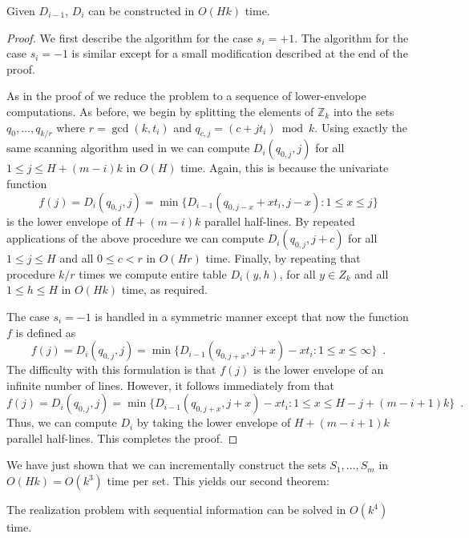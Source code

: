 \documentclass[lotsofwhite]{patmorin}
\newcommand{\Z}{\mathbb{Z}}
\begin{document}
\begin{lem}
Given $D_{i-1}$, $D_i$ can be constructed in $O(Hk)$ time.
\end{lem}

\begin{proof}
We first describe the algorithm for the case $s_i=+1$. The algorithm
for the case $s_i=-1$ is similar except for a small modification
described at the end of the proof.

As in the proof of  we reduce the problem to a 
sequence of lower-envelope
computations.   As before, we begin by
splitting the elements of $\Z_k$ into the sets
$q_{0},\ldots,q_{k/r}$ where $r=\gcd(k,t_i)$ and
$q_{c,j}=(c+jt_i)\bmod k$.
Using exactly the same scanning algorithm used in  we
can compute $D_i(q_{0,j},j)$ for all $1\le j\le H+(m-i)k$ in $O(H)$ time.
Again, this is because the univariate function
\[ f(j) = D_i(q_{0,j},j) = \min\{ D_{i-1}(q_{0,j-x}+xt_i,j-x) : 1\le
x\le j\} 
\]
is the lower envelope of $H+(m-i)k$ parallel half-lines.
By repeated applications of the above procedure we can compute
$D_i(q_{0,j},j+c)$ for all $1\le j\le H$ and all
$0\le c< r$ in $O(Hr)$ time.  Finally, by repeating that
procedure $k/r$ times we compute entire table $D_i(y,h)$, for all
$y\in Z_k$ and all $1\le h\le H$ in $O(Hk)$ time, as required. 

The case $s_{i}=-1$ is handled in a symmetric manner except that now
the function $f$ is defined as
\[
  f(j) = D_{i}(q_{0,j},j) = \min\{D_{i-1}(q_{0,j+x},j+x) - xt_i :
1\le x\le \infty\} \enspace .
\]
The difficulty with this formulation is that $f(j)$ is the lower
envelope of an infinite number of lines.  However, it follows immediately from  that 
\[
  f(j) = D_{i}(q_{0,j},j) = \min\{D_{i-1}(q_{0,j+x},j+x) - xt_i :
1\le x\le H-j+(m-i+1)k\} \enspace .
\]
Thus, we can compute $D_i$ by taking the lower envelope of
$H+(m-i+1)k$ parallel half-lines.  This completes the proof.
\end{proof}

We have just shown that we can incrementally construct the sets
$S_1,\ldots,S_m$ in $O(Hk)=O(k^3)$ time per set.  This yields our
second theorem:

\begin{thm}
The realization problem with sequential information can be solved in
$O(k^4)$ time.
\end{thm}

 

\end{document}

